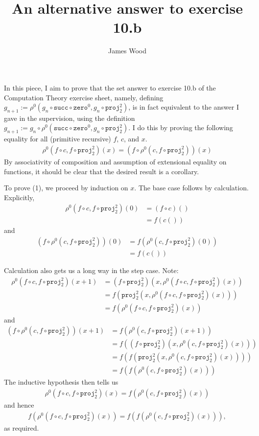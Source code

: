 \documentclass{article}
\begin{document}
\title{An alternative answer to exercise 10.b}
\author{James Wood}
\maketitle

In this piece, I aim to prove that the set answer to exercise 10.b of the Computation Theory exercise sheet, namely, defining $g_{n+1} := \rho^0(g_n \circ \mathtt{succ} \circ \mathtt{zero}^0, g_n \circ \mathtt{proj}_2^2)$, is in fact equivalent to the answer I gave in the supervision, using the definition $g_{n+1} := g_n \circ \rho^0(\mathtt{succ} \circ \mathtt{zero}^0, g_n \circ \mathtt{proj}_2^2)$. I do this by proving the following equality for all (primitive recursive) $f$, $c$, and $x$.
\begin{align}
  \rho^0(f \circ c, f \circ \mathtt{proj}_2^2)(x) = (f \circ \rho^0(c, f \circ \mathtt{proj}_2^2))(x)
\end{align}
By associativity of composition and assumption of extensional equality on functions, it should be clear that the desired result is a corollary.

To prove (1), we proceed by induction on $x$. The base case follows by calculation. Explicitly,
\begin{align*}
  \rho^0(f \circ c, f \circ \mathtt{proj}_2^2)(0)
  & = (f \circ c)()
  \\
  & = f(c())
\end{align*}
and
\begin{align*}
  (f \circ \rho^0(c, f \circ \mathtt{proj}_2^2))(0)
  & = f(\rho^0(c, f \circ \mathtt{proj}_2^2)(0))
  \\
  & = f(c())
\end{align*}

Calculation also gets us a long way in the step case. Note:
\begin{align*}
  \rho^0(f \circ c, f \circ \mathtt{proj}_2^2)(x+1)
  & = (f \circ \mathtt{proj}_2^2)(x, \rho^0(f \circ c, f \circ \mathtt{proj}_2^2)(x))
  \\
  & = f(\mathtt{proj}_2^2(x, \rho^0(f \circ c, f \circ \mathtt{proj}_2^2)(x)))
  \\
  & = f(\rho^0(f \circ c, f \circ \mathtt{proj}_2^2)(x))
\end{align*}
and
\begin{align*}
  (f \circ \rho^0(c, f \circ \mathtt{proj}_2^2))(x+1)
  & = f(\rho^0(c, f \circ \mathtt{proj}_2^2)(x+1))
  \\
  & = f((f \circ \mathtt{proj}_2^2)(x, \rho^0(c, f \circ \mathtt{proj}_2^2)(x)))
  \\
  & = f(f(\mathtt{proj}_2^2(x, \rho^0(c, f \circ \mathtt{proj}_2^2)(x))))
  \\
  & = f(f(\rho^0(c, f \circ \mathtt{proj}_2^2)(x)))
\end{align*}
The inductive hypothesis then tells us
\begin{align*}
  \rho^0(f \circ c, f \circ \mathtt{proj}_2^2)(x) = f(\rho^0(c, f \circ \mathtt{proj}_2^2)(x))
\end{align*}
and hence
\begin{align*}
  f(\rho^0(f \circ c, f \circ \mathtt{proj}_2^2)(x)) = f(f(\rho^0(c, f \circ \mathtt{proj}_2^2)(x))),
\end{align*}
as required.
\end{document}

